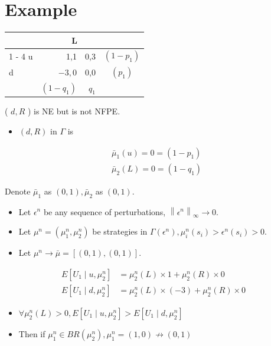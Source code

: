 \documentclass[10pt]{article}
\begin{document}
\section*{Example}
\begin{center}
\begin{tabular}{lrrc}
\multicolumn{4}{c}{$\mathbf{L}$} \\
\cline { 1 - 4 }
u & 1,1 & 0,3 & $\left(1-p_{1}\right)$ \\
\hline
d & $-3,0$ & 0,0 & $\left(p_{1}\right)$ \\
\hline
 & $\left(1-q_{1}\right)$ & $q_{1}$ &  \\
\hline
\end{tabular}
\end{center}

( $d, R$ ) is NE but is not NFPE.

\begin{itemize}
  \item $(d, R)$ in $\Gamma$ is
\end{itemize}

$$
\begin{aligned}
& \bar{\mu}_{1}(u)=0=\left(1-p_{1}\right) \\
& \bar{\mu}_{2}(L)=0=\left(1-q_{1}\right)
\end{aligned}
$$

Denote $\bar{\mu}_{1}$ as $(0,1), \bar{\mu}_{2}$ as $(0,1)$.

\begin{itemize}
  \item Let $\epsilon^{n}$ be any sequence of perturbations, $\left\|\epsilon^{n}\right\|_{\infty} \rightarrow 0$.
  \item Let $\mu^{n}=\left(\mu_{1}^{n}, \mu_{2}^{n}\right)$ be strategies in $\Gamma\left(\epsilon^{n}\right), \mu_{i}^{n}\left(s_{i}\right)>\epsilon^{n}\left(s_{i}\right)>0$.
  \item Let $\mu^{n} \rightarrow \bar{\mu}=[(0,1),(0,1)]$.
\end{itemize}

$$
\begin{aligned}
E\left[U_{1} \mid u, \mu_{2}^{n}\right] & =\mu_{2}^{n}(L) \times 1+\mu_{2}^{n}(R) \times 0 \\
E\left[U_{1} \mid d, \mu_{2}^{n}\right] & =\mu_{2}^{n}(L) \times(-3)+\mu_{2}^{n}(R) \times 0
\end{aligned}
$$

\begin{itemize}
  \item $\forall \mu_{2}^{n}(L)>0, E\left[U_{1} \mid u, \mu_{2}^{n}\right]>E\left[U_{1} \mid d, \mu_{2}^{n}\right]$
  \item Then if $\mu_{1}^{n} \in B R\left(\mu_{2}^{n}\right), \mu_{1}^{n}=(1,0) \nrightarrow(0,1)$
\end{itemize}
\end{document}
